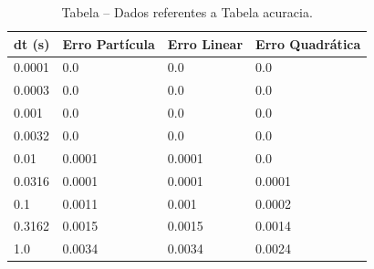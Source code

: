 \begin{table}[H]
\centering
\caption{Tabela – Dados referentes a Tabela acuracia.}
\label{tab:tabela_acuracia}
\begin{tabular}{llll}
\toprule
dt (s) & Erro Partícula & Erro Linear & Erro Quadrática \\
\midrule
0.0001 & 0.0 & 0.0 & 0.0 \\
0.0003 & 0.0 & 0.0 & 0.0 \\
0.001 & 0.0 & 0.0 & 0.0 \\
0.0032 & 0.0 & 0.0 & 0.0 \\
0.01 & 0.0001 & 0.0001 & 0.0 \\
0.0316 & 0.0001 & 0.0001 & 0.0001 \\
0.1 & 0.0011 & 0.001 & 0.0002 \\
0.3162 & 0.0015 & 0.0015 & 0.0014 \\
1.0 & 0.0034 & 0.0034 & 0.0024 \\
\bottomrule
\end{tabular}

\end{table}
